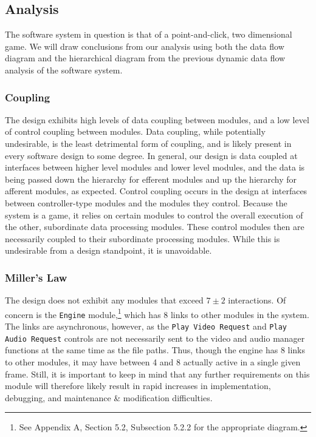 \documentclass{article}
\begin{document}
	\subsection{Analysis}
		The software system in question is that of a point-and-click, two dimensional game. We will draw conclusions from our analysis using both the data flow diagram and the hierarchical diagram from the previous dynamic data flow analysis of the software system. 
		\subsubsection{Coupling}
			The design exhibits high levels of data coupling between modules, and a low level of control coupling between modules. Data coupling, while potentially undesirable, is the least detrimental form of coupling, and is likely present in every software design to some degree. In general, our design is data coupled at interfaces between higher level modules and lower level modules, and the data is being passed down the hierarchy for efferent modules and up the hierarchy for afferent modules, as expected. Control coupling occurs in the design at interfaces between controller-type modules and the modules they control. Because the system is a game, it relies on certain modules to control the overall execution of the other, subordinate data processing modules. These control modules then are necessarily coupled to their subordinate processing modules. While this is undesirable from a design standpoint, it is unavoidable. 
		\subsubsection{Miller's Law}
			The design does not exhibit any modules that exceed $7\pm2$ interactions. Of concern is the \texttt{Engine} module,\footnote{See Appendix A, Section 5.2, Subsection 5.2.2 for the appropriate diagram.} which has 8 links to other modules in the system. The links are asynchronous, however, as the \texttt{Play Video Request} and \texttt{Play Audio Request} controls are not necessarily sent to the video and audio manager functions at the same time as the file paths. Thus, though the engine has 8 links to other modules, it may have between 4 and 8 actually active in a single given frame. Still, it is important to keep in mind that any further requirements on this module will therefore likely result in rapid increases in implementation, debugging, and maintenance \& modification difficulties. 
			
\end{document}
